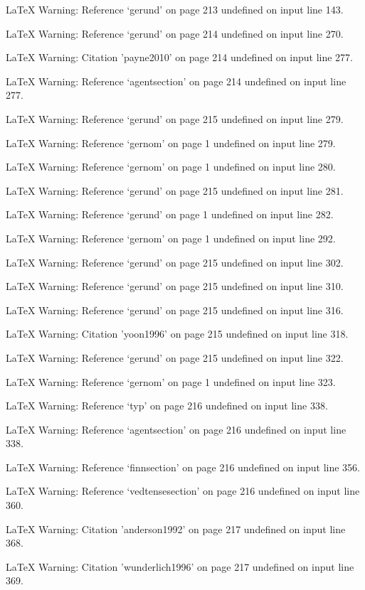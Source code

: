 LaTeX Warning: Reference `gerund' on page 213 undefined on input line 143.


LaTeX Warning: Reference `gerund' on page 214 undefined on input line 270.


LaTeX Warning: Citation 'payne2010' on page 214 undefined on input line 277.


LaTeX Warning: Reference `agentsection' on page 214 undefined on input line 277.


LaTeX Warning: Reference `gerund' on page 215 undefined on input line 279.


LaTeX Warning: Reference `gernom' on page 1 undefined on input line 279.


LaTeX Warning: Reference `gernom' on page 1 undefined on input line 280.


LaTeX Warning: Reference `gerund' on page 215 undefined on input line 281.


LaTeX Warning: Reference `gerund' on page 1 undefined on input line 282.


LaTeX Warning: Reference `gernom' on page 1 undefined on input line 292.


LaTeX Warning: Reference `gerund' on page 215 undefined on input line 302.


LaTeX Warning: Reference `gerund' on page 215 undefined on input line 310.


LaTeX Warning: Reference `gerund' on page 215 undefined on input line 316.


LaTeX Warning: Citation 'yoon1996' on page 215 undefined on input line 318.


LaTeX Warning: Reference `gerund' on page 215 undefined on input line 322.


LaTeX Warning: Reference `gernom' on page 1 undefined on input line 323.


LaTeX Warning: Reference `typ' on page 216 undefined on input line 338.


LaTeX Warning: Reference `agentsection' on page 216 undefined on input line 338.


LaTeX Warning: Reference `finnsection' on page 216 undefined on input line 356.


LaTeX Warning: Reference `vedtensesection' on page 216 undefined on input line 360.


LaTeX Warning: Citation 'anderson1992' on page 217 undefined on input line 368.


LaTeX Warning: Citation 'wunderlich1996' on page 217 undefined on input line 369.



